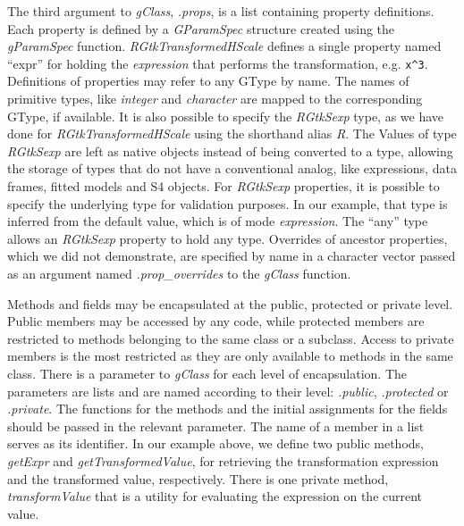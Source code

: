 \documentclass[article]{jss}
\begin{document}
The third argument to \emph{gClass}, \emph{.props}, is a list containing property definitions.
Each property is defined by a \emph{GParamSpec} structure created
using the 
\emph{gParamSpec} function. \emph{RGtkTransformedHScale} defines a
single 
property named ``expr'' for holding the  \emph{expression}
that 
performs the transformation, e.g. \verb+x^3+. Definitions of
properties may refer to any GType by name. 
The names of primitive  types, like \emph{integer} and
\emph{character} 
are mapped to the corresponding GType, if available. It is also
possible to specify the 
\emph{RGtkSexp} type, as we have done for
\emph{RGtkTransformedHScale} using the shorthand alias \emph{R}.  The
Values of type \emph{RGtkSexp} are left
as native  objects instead of being converted to a
 type, allowing the storage of  types that do
not have a conventional  analog, like expressions, data
frames, fitted models and S4 objects. For \emph{RGtkSexp} properties,
it is possible to specify the underlying  type for
validation purposes. In our example, that type is inferred from the
default value, which is of mode \emph{expression}.  The ``any'' type
allows an \emph{RGtkSexp} property to hold any  type.
Overrides of ancestor properties, which we did not demonstrate, are
specified by name in a character vector passed as an argument named
\emph{.prop\_overrides} to the \emph{gClass} function.

Methods and fields may be encapsulated at the public, protected or
private level.  Public members may be accessed by any code, while
protected members are restricted to methods belonging to the same
class or a subclass. Access to private members is the most restricted
as they are only available to methods in the same class. There is a
parameter to \emph{gClass} for each level of encapsulation. The parameters are lists and are named according to
their level: \emph{.public}, \emph{.protected} or \emph{.private}.
The functions for the methods and the initial assignments for the
fields should be passed in the relevant parameter. The name of a member in a list serves as its
identifier. In our example above, we define two public methods,
\emph{getExpr} and \emph{getTransformedValue}, for retrieving the
transformation expression and the transformed value,
respectively. There is one private method, \emph{transformValue} that
is a utility for evaluating the expression on the current value.
\end{document}
